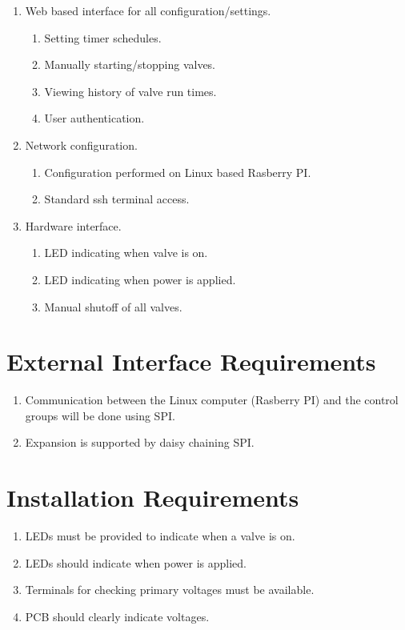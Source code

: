 \documentclass[12pt,letterpaper]{article}
\begin{document}
\begin{enumerate}
\item Web based interface for all configuration/settings.
	\begin{enumerate}
	\item Setting timer schedules.
	\item Manually starting/stopping valves.
	\item Viewing history of valve run times.
	\item User authentication.
	\end{enumerate}
\item Network configuration.
	\begin{enumerate}
	\item Configuration performed on Linux based Rasberry PI.
	\item Standard ssh terminal access.
	\end{enumerate}
\item Hardware interface.
	\begin{enumerate}
	\item LED indicating when valve is on.
	\item LED indicating when power is applied.
	\item Manual shutoff of all valves.
	\end{enumerate}
\end{enumerate}


\pagebreak
\section{External Interface Requirements}
\begin{enumerate}
\item Communication between the Linux computer (Rasberry PI) and
		the control groups will be done using SPI.
\item Expansion is supported by daisy chaining SPI.
\end{enumerate}


\section{Installation Requirements}
\begin{enumerate}
	\item LEDs must be provided to indicate when a valve is on.
	\item LEDs should indicate when power is applied.
	\item Terminals for checking primary voltages must be available.
	\item PCB should clearly indicate voltages.
\end{enumerate}
\end{document}
